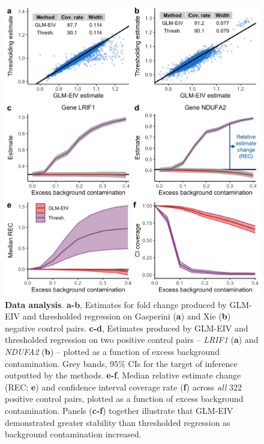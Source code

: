 \documentclass[12pt]{article}
\begin{document}
\clearpage
\begin{figure}
	\centering
	\includegraphics[width=0.9\linewidth]{../../figures/data_analysis/annotated_plot_crop}
	\caption{\textbf{Data analysis}. \textbf{a-b}, Estimates for fold change produced by GLM-EIV and thresholded regression on Gasperini (\textbf{a}) and Xie (\textbf{b}) negative control pairs. \textbf{c-d}, Estimates produced by GLM-EIV and thresholded regression on two positive control pairs -- \textit{LRIF1} (\textbf{a}) and \textit{NDUFA2} (\textbf{b}) -- plotted as a function of excess background contamination. Grey bands, 95\% CIs for the target of inference outputted by the methods. \textbf{e-f}, Median relative estimate change (REC; \textbf{e}) and confidence interval coverage rate (\textbf{f}) across \textit{all} 322 positive control pairs, plotted as a function of excess background contamination. Panels (\textbf{c-f}) together illustrate that GLM-EIV demonstrated greater stability than thresholded regression as background contamination increased.}\label{fig:real_data}
\end{figure}
\end{document}
